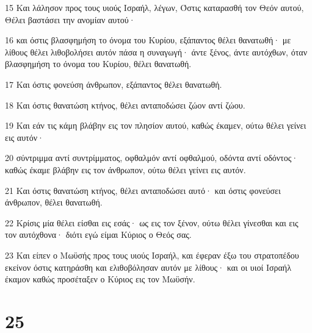 \par 15 Και λάλησον προς τους υιούς Ισραήλ, λέγων, Όστις καταρασθή τον Θεόν αυτού, Θέλει βαστάσει την ανομίαν αυτού·
\par 16 και όστις βλασφημήση το όνομα του Κυρίου, εξάπαντος θέλει θανατωθή· με λίθους θέλει λιθοβολήσει αυτόν πάσα η συναγωγή· άντε ξένος, άντε αυτόχθων, όταν βλασφημήση το όνομα του Κυρίου, θέλει θανατωθή.
\par 17 Και όστις φονεύση άνθρωπον, εξάπαντος θέλει θανατωθή.
\par 18 Και όστις θανατώση κτήνος, θέλει ανταποδώσει ζώον αντί ζώου.
\par 19 Και εάν τις κάμη βλάβην εις τον πλησίον αυτού, καθώς έκαμεν, ούτω θέλει γείνει εις αυτόν·
\par 20 σύντριμμα αντί συντρίμματος, οφθαλμόν αντί οφθαλμού, οδόντα αντί οδόντος· καθώς έκαμε βλάβην εις τον άνθρωπον, ούτω θέλει γείνει εις αυτόν.
\par 21 Και όστις θανατώση κτήνος, θέλει ανταποδώσει αυτό· και όστις φονεύσει άνθρωπον, θέλει θανατωθή.
\par 22 Κρίσις μία θέλει είσθαι εις εσάς· ως εις τον ξένον, ούτω θέλει γίνεσθαι και εις τον αυτόχθονα· διότι εγώ είμαι Κύριος ο Θεός σας.
\par 23 Και είπεν ο Μωϋσής προς τους υιούς Ισραήλ, και έφεραν έξω του στρατοπέδου εκείνον όστις κατηράσθη και ελιθοβόλησαν αυτόν με λίθους· και οι υιοί Ισραήλ έκαμον καθώς προσέταξεν ο Κύριος εις τον Μωϋσήν.

\chapter{25}

